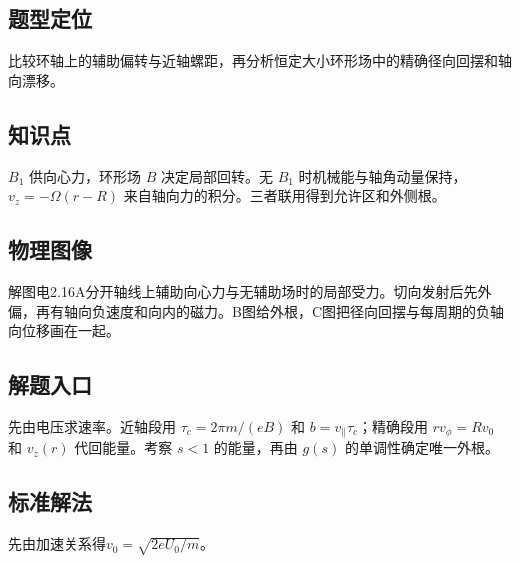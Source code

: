 \documentclass[UTF8,fontset=fandol,a4paper,11pt]{ctexart}
\begin{document}
\subsection*{题型定位}

比较环轴上的辅助偏转与近轴螺距，再分析恒定大小环形场中的精确径向回摆和轴向漂移。



\subsection*{知识点}

$B_1$ 供向心力，环形场 $B$ 决定局部回转。无 $B_1$ 时机械能与轴角动量保持，$v_z=-\Omega(r-R)$ 来自轴向力的积分。三者联用得到允许区和外侧根。



\subsection*{物理图像}

解图电2.16A分开轴线上辅助向心力与无辅助场时的局部受力。切向发射后先外偏，再有轴向负速度和向内的磁力。B图给外根，C图把径向回摆与每周期的负轴向位移画在一起。



\subsection*{解题入口}

先由电压求速率。近轴段用 $\tau_c=2\pi m/(eB)$ 和 $b=v_\parallel\tau_c$；精确段用 $rv_\phi=Rv_0$ 和 $v_z(r)$ 代回能量。考察 $s<1$ 的能量，再由 $g(s)$ 的单调性确定唯一外根。


\subsection*{标准解法}

先由加速关系得$v_0=\sqrt{2eU_0/m}$。
\end{document}
